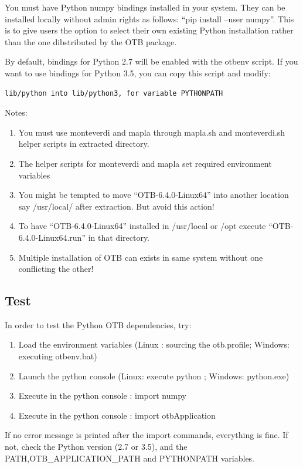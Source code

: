 \documentclass[10pt,a4paper]{article}
\begin{document}
You must have Python numpy bindings installed in your system. They can be installed locally without admin rights as follows: “pip install –user numpy”. This is to give users the option to select their own existing Python installation rather than the one dibstributed by the OTB package.

By default, bindings for Python 2.7 will be enabled with the otbenv script. If you want to use bindings for Python 3.5, you can copy this script and modify:
\begin{verbatim}
lib/python into lib/python3, for variable PYTHONPATH
\end{verbatim}

Notes:
\begin{enumerate}

\item You must use monteverdi and mapla through mapla.sh and monteverdi.sh helper scripts in extracted directory.
\item The helper scripts for monteverdi and mapla set required environment variables
\item You might be tempted to move “OTB-6.4.0-Linux64” into another location say /usr/local/ after extraction. But avoid this action!
\item To have “OTB-6.4.0-Linux64” installed in /usr/local or /opt execute “OTB-6.4.0-Linux64.run” in that directory.
\item Multiple installation of OTB can exists in same system without one conflicting the other!

\end{enumerate}

\subsection{Test}
In order to test the Python OTB dependencies, try:
\begin{enumerate}
\item Load the environment variables (Linux : sourcing the otb.profile; Windows: executing otbenv.bat) 
\item Launch the python console (Linux: execute python ; Windows: python.exe)
\item Execute in the python console : import numpy
\item Execute in the python console : import otbApplication
\end{enumerate}
If no error message is printed after the import commands, everything is fine. If not, check the Python version (2.7 or 3.5), and the PATH,OTB_APPLICATION_PATH and PYTHONPATH variables.
\end{document}
